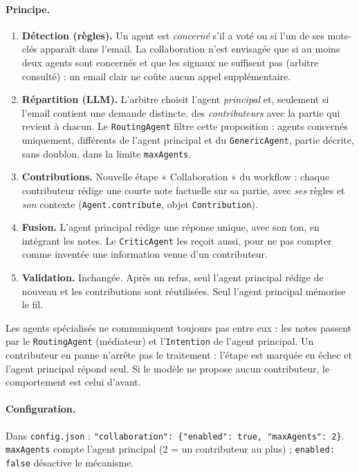 \documentclass[11pt,a4paper]{article}
\newcommand{\code}[1]{\texttt{#1}}
\begin{document}
\paragraph{Principe.}
\begin{enumerate}
  \item \textbf{Détection (règles).} Un agent est \emph{concerné} s'il a voté ou si l'un de
        ses mots-clés apparaît dans l'email. La collaboration n'est envisagée que si au
        moins deux agents sont concernés et que les signaux ne suffisent pas (arbitre
        consulté) : un email clair ne coûte aucun appel supplémentaire.
  \item \textbf{Répartition (LLM).} L'arbitre choisit l'agent \emph{principal} et, seulement
        si l'email contient une demande distincte, des \emph{contributeurs} avec la partie
        qui revient à chacun. Le \code{RoutingAgent} filtre cette proposition : agents
        concernés uniquement, différents de l'agent principal et du \code{GenericAgent},
        partie décrite, sans doublon, dans la limite \code{maxAgents}.
  \item \textbf{Contributions.} Nouvelle étape « Collaboration » du workflow : chaque
        contributeur rédige une courte note factuelle sur sa partie, avec \emph{ses} règles
        et \emph{son} contexte (\code{Agent.contribute}, objet \code{Contribution}).
  \item \textbf{Fusion.} L'agent principal rédige une réponse unique, avec son ton, en
        intégrant les notes. Le \code{CriticAgent} les reçoit aussi, pour ne pas compter
        comme inventée une information venue d'un contributeur.
  \item \textbf{Validation.} Inchangée. Après un refus, seul l'agent principal rédige de
        nouveau et les contributions sont réutilisées. Seul l'agent principal mémorise le
        fil.
\end{enumerate}

Les agents spécialisés ne communiquent toujours pas entre eux : les notes passent par le
\code{RoutingAgent} (médiateur) et l'\code{Intention} de l'agent principal. Un contributeur
en panne n'arrête pas le traitement : l'étape est marquée en échec et l'agent principal
répond seul. Si le modèle ne propose aucun contributeur, le comportement est celui d'avant.

\paragraph{Configuration.} Dans \code{config.json} :
\code{"collaboration": \{"enabled": true, "maxAgents": 2\}}. \code{maxAgents} compte
l'agent principal (2 = un contributeur au plus) ; \code{enabled: false} désactive le
mécanisme.
\end{document}
